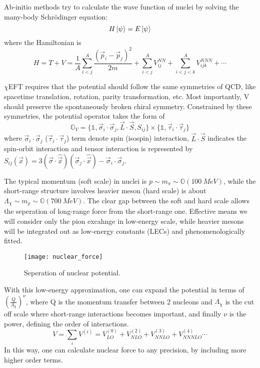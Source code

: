 
Ab-initio methods try to calculate the wave function of nuclei by solving the
many-body Schr\"{o}dinger equation:
\begin{equation}
    H\ket{\psi} = E\ket{\psi}
\end{equation}
where the Hamiltonian is
\begin{equation}
    H = T + V = \frac{1}{A} \sum_{i<j}^A \frac{(\vec{p}_i - \vec{p}_j)^2}{2m} 
	+ \sum_{i<j}^A V_{ij}^{NN} + \sum_{i<j<k}^A V_{ijk}^{NNN} + \cdots
\end{equation}

$\chi$EFT requires that the potential should follow the same symmetries of QCD,
like spacetime translation, rotation, parity transformation, etc. Most importantly, V should
preserve the spontaneously broken chiral symmetry. Constrained by these symmetries,
the potential operator takes the form of
\begin{equation}
    \mathds{O}_V = \{\mathds{1}, \vec{\sigma}_i \cdot \vec{\sigma}_j, \vec{L} \cdot \vec{S}, S_{ij}\} 
	\times \{\mathds{1}, \vec{\tau}_i \cdot \vec{\tau}_j\}
\end{equation}
where $\vec{\sigma}_i \cdot \vec{\sigma}_j$ ($\vec{\tau}_i \cdot \vec{\tau}_j$) term
denote spin (isospin) interaction, 
$\vec{L} \cdot \vec{S}$ indicates the spin-orbit interaction and tensor interaction
is represented by 
$S_{ij}(\vec{x}) = 3(\vec{\sigma} \cdot \hat{\vec{x}})(\vec{\sigma}_j \cdot \hat{\vec{x}}) - \vec{\sigma}_i \cdot \vec{\sigma}_j$.

The typical momentum (soft scale) in nuclei is $p \sim m_\pi \sim \mathds{O}(100\ MeV)$, while the
short-range structure involves heavier meson (hard scale) is about 
$\Lambda_\chi \sim m_\rho \sim \mathds{O}(700 \ MeV)$. 
The clear gap between the soft and hard scale allows the seperation of long-range force 
from the short-range one. Effective means we will consider only the pion excahnge
in low-energy scale, while heavier mesons will be integrated out as low-energy
constants (LECs) and phenomenologically fitted. 
\begin{figure}[H]
    \centering
    \texttt{[image: nuclear\_force]}
    \caption{Seperation of nuclear potential.}
\end{figure}
With this low-energy approximation, one can expand the potential in terms of
$\left(\frac{Q}{\Lambda_\chi}\right)^\nu$, where Q is the momentum transfer
between 2 nucleons and $\Lambda_\chi$ is the cut off scale where short-range 
interactions becomes important, and
finally $\nu$ is the power, defining the order of interactions. 
\begin{equation}
    V = \sum_i V^{(i)} = V^{(0)}_{LO} + V^{(2)}_{NLO} + V^{(3)}_{NNLO} + V^{(4)}_{NNNLO} \cdots
\end{equation}
In this way, one can calculate nuclear force to any precision, by including
more higher order terms.

